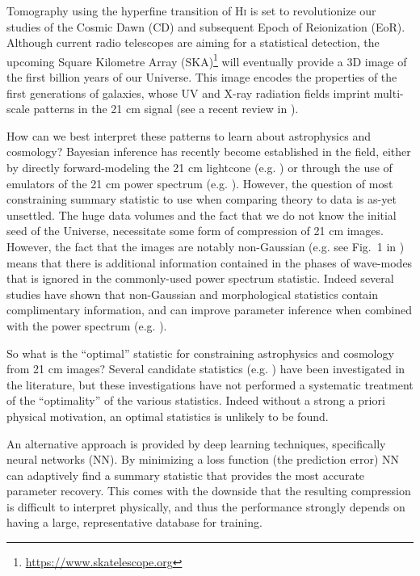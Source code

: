 \documentclass[fleqn,usenatbib]{mnras}
\begin{document}
Tomography using the hyperfine transition of \textsc{Hi} is set to revolutionize our studies of the Cosmic Dawn (CD) and subsequent Epoch of Reionization (EoR).  Although current radio telescopes are aiming for a statistical detection, the upcoming Square Kilometre Array (SKA)\footnote{\url{https://www.skatelescope.org}} will eventually provide a 3D image of the first billion years of our Universe.  This image encodes the properties of the first generations of galaxies, whose UV and X-ray radiation fields imprint multi-scale patterns in the 21 cm signal (see a recent review in \citealt{Mesinger2019}).

How can we best interpret these patterns to learn about astrophysics and cosmology? 
Bayesian inference has recently become established in the field, either by directly forward-modeling the 21 cm lightcone (e.g. \citealt{greig17, greig18, park19, Greig21}) or through the use of emulators of the 21 cm power spectrum (e.g. \citealt{Kern17, SP18, jennings19, Ghara20, Mondal20}). However, the question of most constraining summary statistic to use when comparing theory to data is as-yet unsettled.   The huge data volumes and the fact that we do not know the initial seed of the Universe, necessitate some form of compression of 21 cm images. However, the fact that the images are notably non-Gaussian (e.g. see Fig.~1 in \citealt{mellema15}) means that there is additional information contained in the phases of wave-modes that is ignored in the commonly-used power spectrum statistic. Indeed several studies have shown that non-Gaussian and morphological statistics contain complimentary information, and can improve parameter inference when combined with the power spectrum (e.g. \citealt{gazagnes21, watkinson21}).

So what is the \enquote{optimal} statistic for constraining astrophysics and cosmology from 21 cm images? Several candidate statistics (e.g. \citealt{shimabukuro2015studying,shimabukuro2017constraining,majumdar2018quantifying,giri2018a,giri2019,gorce2019studying,watkinson2019,watkinson21,gazagnes21}) have been investigated in the literature, but these investigations have not performed a systematic treatment of the \enquote{optimality} of the various statistics. 
Indeed without a strong a priori physical motivation, an optimal statistics is unlikely to be found.

An alternative approach is provided by deep learning techniques, specifically neural networks (NN). By minimizing a loss function (the prediction error) NN can adaptively find a summary statistic that provides the most accurate parameter recovery. This comes with the downside that the resulting compression is difficult to interpret physically, and thus the performance strongly depends on having a large, representative database for training.
\end{document}
